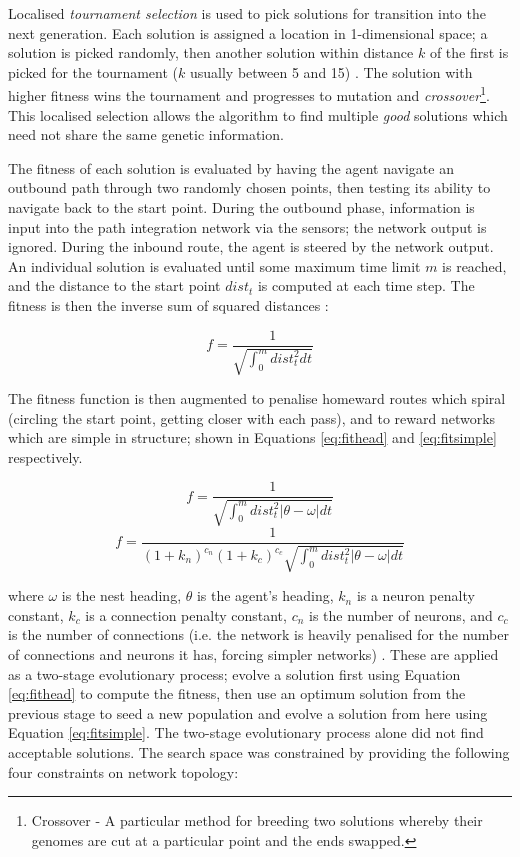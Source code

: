 \documentclass[a4paper,11pt,twoside,openright]{article}
\begin{document}
Localised \textit{tournament selection} is used
to pick solutions for transition into the next generation. Each
solution is assigned a location in 1-dimensional space; a solution is
picked randomly, then another solution within distance $k$ of the
first is picked for the tournament ($k$ usually between 5 and 15)
\cite{Haferlach2007}. The solution with higher fitness wins the
tournament and progresses to mutation and
\textit{crossover}\footnote{Crossover - A particular method for
  breeding two solutions whereby their genomes are cut at a particular
  point and the ends swapped.}. This localised selection allows the
algorithm to find multiple \textit{good} solutions which need not
share the same genetic information.
\newline
\par

The fitness of each solution is evaluated by having the agent navigate
an outbound path through two randomly chosen points, then testing its
ability to navigate back to the start point. During the outbound
phase, information is input into the path integration network via the
sensors; the network output is ignored. During the inbound route, the
agent is steered by the network output.  An individual solution is
evaluated until some maximum time limit $m$ is reached, and the
distance to the start point $dist_t$ is computed at each time step. The
fitness is then the inverse sum of squared distances
\cite{Haferlach2007}:

\begin{equation}
 f = \frac{1}{\sqrt{\int_{0}^m dist_t^2 dt}}
\end{equation}

The fitness function is then augmented to penalise homeward routes which
spiral (circling the start point, getting closer with each pass), and
to reward networks which are simple in structure; shown in
Equations \ref{eq:fithead} and \ref{eq:fitsimple} respectively.

\begin{equation}
  \label{eq:fithead}
  f = \frac{1}{\sqrt{\int_{0}^m dist_t^2 |\theta - \omega | dt}}
\end{equation}
\begin{equation}
  \label{eq:fitsimple}
  f = \frac{1}{(1 + k_n)^{c_n}(1 + k_c)^{c_c}
    \sqrt{\int_{0}^m dist_t^2 |\theta - \omega | dt}}
\end{equation}

where $\omega$ is the nest heading, $\theta$ is the agent's heading,
$k_n$ is a neuron penalty constant, $k_c$ is a connection penalty
constant, $c_n$ is the number of neurons, and $c_c$ is the number of
connections (i.e.  the network is heavily penalised for the number of
connections and neurons it has, forcing simpler networks)
\cite{Haferlach2007}. These are applied as a two-stage evolutionary
process; evolve a solution first using Equation \ref{eq:fithead} to
compute the fitness, then use an optimum solution from the previous
stage to seed a new population and evolve a solution from here using
Equation \ref{eq:fitsimple}. The two-stage evolutionary process alone
did not find acceptable solutions. The search space was constrained by
providing the following four constraints on network topology:
\end{document}
